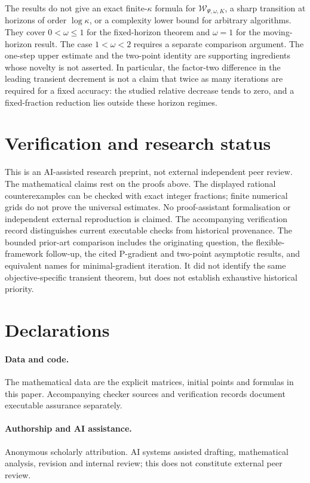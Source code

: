 \documentclass[11pt,a4paper]{article}
\theoremstyle{remark}
\newcommand{\W}{\mathcal W}
\begin{document}
The results do not give an exact finite-$\kappa$ formula for $\W_{\Psi,\omega,K}$, a sharp transition at horizons of order $\log\kappa$, or a complexity lower bound for arbitrary algorithms. They cover $0<\omega\le1$ for the fixed-horizon theorem and $\omega=1$ for the moving-horizon result. The case $1<\omega<2$ requires a separate comparison argument. The one-step upper estimate and the two-point identity are supporting ingredients whose novelty is not asserted. In particular, the factor-two difference in the leading transient decrement is not a claim that twice as many iterations are required for a fixed accuracy: the studied relative decrease tends to zero, and a fixed-fraction reduction lies outside these horizon regimes.

\section*{Verification and research status}

This is an AI-assisted research preprint, not external independent peer review. The mathematical claims rest on the proofs above. The displayed rational counterexamples can be checked with exact integer fractions; finite numerical grids do not prove the universal estimates. No proof-assistant formalisation or independent external reproduction is claimed. The accompanying verification record distinguishes current executable checks from historical provenance. The bounded prior-art comparison includes the originating question, the flexible-framework follow-up, the cited P-gradient and two-point asymptotic results, and equivalent names for minimal-gradient iteration. It did not identify the same objective-specific transient theorem, but does not establish exhaustive historical priority.

\section*{Declarations}
\paragraph{Data and code.}
The mathematical data are the explicit matrices, initial points and formulas in this paper. Accompanying checker sources and verification records document executable assurance separately.
\paragraph{Authorship and AI assistance.}
Anonymous scholarly attribution. AI systems assisted drafting, mathematical analysis, revision and internal review; this does not constitute external peer review.
\end{document}

